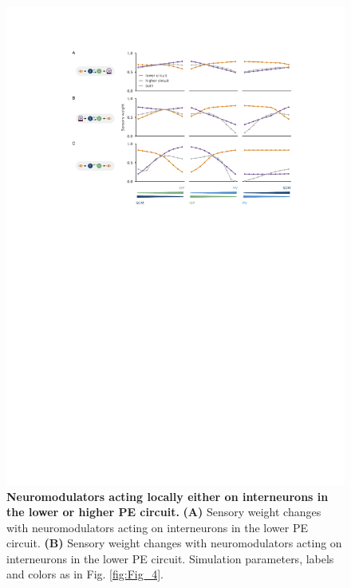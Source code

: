 \documentclass[10pt,a4paper,draft]{article}
\begin{document}
\begin{figure}[!h]
	\centering
    \includegraphics{../results/figures/final/Fig_4_S1}%
\caption{\footnotesize{\bf Neuromodulators acting locally either on interneurons in the lower or higher PE circuit. \newline}  
{\bf (A)} Sensory weight changes with neuromodulators acting on interneurons in the lower PE circuit.
{\bf (B)} Sensory weight changes with neuromodulators acting on interneurons in the lower PE circuit. Simulation parameters, labels and colors as in Fig. \ref{fig:Fig_4}. 
}
\label{fig:Fig_4_S1}
\end{figure}
\end{document}
